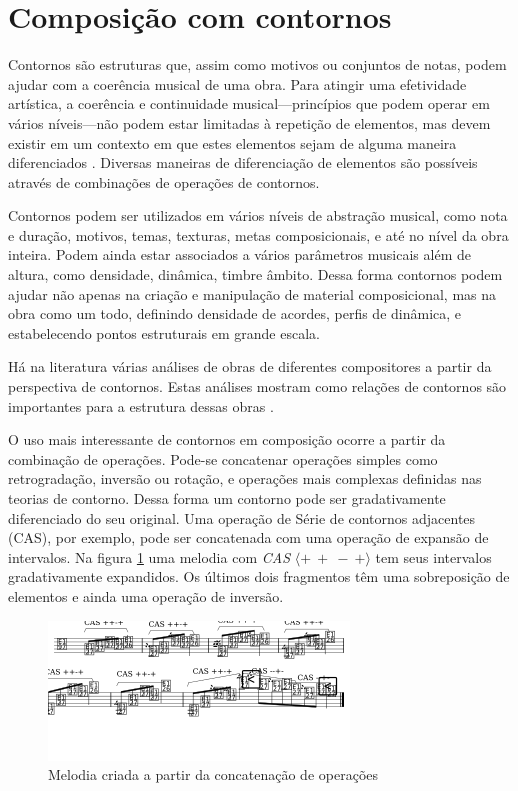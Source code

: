 \documentclass[brazil]{article}
\newcommand{\termo}[1]{\textit{#1}}
\begin{document}
\section{Composição com contornos}
\label{sec:comp-com-cont}

Contornos são estruturas que, assim como motivos ou conjuntos de
notas, podem ajudar com a coerência musical de uma obra. Para atingir
uma efetividade artística, a coerência e continuidade
musical---princípios que podem operar em vários níveis---não podem
estar limitadas à repetição de elementos, mas devem existir em um
contexto em que estes elementos sejam de alguma maneira diferenciados
\cite[p. 296]{kliewer75:aspects}. Diversas maneiras de diferenciação
de elementos são possíveis através de combinações de operações de
contornos.

Contornos podem ser utilizados em vários níveis de abstração musical,
como nota e duração, motivos, temas, texturas, metas composicionais, e
até no nível da obra inteira. Podem ainda estar associados a vários
parâmetros musicais além de altura, como densidade, dinâmica, timbre
âmbito. Dessa forma contornos podem ajudar não apenas na criação e
manipulação de material composicional, mas na obra como um todo,
definindo densidade de acordes, perfis de dinâmica, e estabelecendo
pontos estruturais em grande escala.

Há na literatura várias análises de obras de diferentes compositores a
partir da perspectiva de contornos. Estas análises mostram como
relações de contornos são importantes para a estrutura dessas obras
\cite{friedmann85:methodology,clifford95:contour,beard03:contour}.

O uso mais interessante de contornos em composição ocorre a partir da
combinação de operações. Pode-se concatenar operações simples como
retrogradação, inversão ou rotação, e operações mais complexas
definidas nas teorias de contorno. Dessa forma um contorno pode ser
gradativamente diferenciado do seu original. Uma operação de Série de
contornos adjacentes (CAS), por exemplo, pode ser concatenada com uma
operação de expansão de intervalos. Na figura
\ref{fig:concatenacao-operacoes} uma melodia com \termo{CAS}
$\langle+\:+\:-\:+\rangle$ tem seus intervalos gradativamente
expandidos. Os últimos dois fragmentos têm uma sobreposição de
elementos e ainda uma operação de inversão.

\begin{figure}
  \centering
  \includegraphics[scale=2.8]{melodia-friedmann}
  \caption{Melodia criada a partir da concatenação de operações}
  \label{fig:concatenacao-operacoes}
\end{figure}
\end{document}
